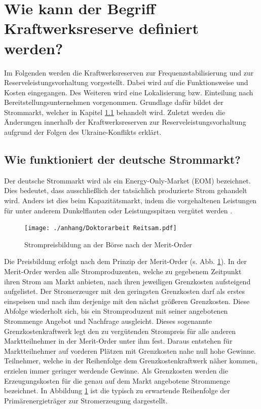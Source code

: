 \section{Wie kann der Begriff Kraftwerksreserve definiert werden?}

	Im Folgenden werden die Kraftwerksreserven zur Frequenzstabilisierung und zur Reserveleistungsvorhaltung vorgestellt.
	Dabei wird auf die Funktionsweise und Kosten eingegangen.
	Des Weiteren wird eine Lokalisierung bzw. Einteilung nach Bereitstellungsunternehmen vorgenommen.
	Grundlage dafür bildet der Strommarkt, welcher in Kapitel \ref{sect: Wie funktioniert der deutsche Strommarkt?} behandelt wird.
	Zuletzt werden die Änderungen innerhalb der Kraftwerksreserven zur Reserveleistungsvorhaltung aufgrund der Folgen des Ukraine-Konflikts erklärt.

	\subsection{Wie funktioniert der deutsche Strommarkt?} \label{sect: Wie funktioniert der deutsche Strommarkt?}
	
		Der deutsche Strommarkt wird als ein Energy-Only-Market (EOM) bezeichnet.
		Dies bedeutet, dass ausschließlich der tatsächlich produzierte Strom gehandelt wird.
		Anders ist dies beim Kapazitätsmarkt, indem die vorgehaltenen Leistungen für unter anderem Dunkelflauten oder Leistungsspitzen vergütet werden \cite{haucap}.
	
		\begin{figure} [H]
			\centering
			\label{Abb. Strompreisbildung Merit Order ohne EE}
			\texttt{[image: ./anhang/Doktorarbeit Reitsam.pdf]}
			\caption{Strompreisbildung an der Börse nach der Merit-Order \cite[S. 68]{Doktorarbeit_Reitsam}}
		\end{figure}
	
		Die Preisbildung erfolgt nach dem Prinzip der Merit-Order (s. Abb. \ref{Abb. Strompreisbildung Merit Order ohne EE}).
		In der Merit-Order werden alle Stromproduzenten, welche zu gegebenem Zeitpunkt ihren Strom am Markt anbieten, nach ihren jeweiligen Grenzkosten aufsteigend aufgelistet.
		Der Stromerzeuger mit den geringsten Grenzkosten darf als erstes einspeisen und nach ihm derjenige mit den nächst größeren Grenzkosten.
		Diese Abfolge wiederholt sich, bis ein Stromproduzent mit seiner angebotenen Strommenge Angebot und Nachfrage ausgleicht.
		Dieses sogenannte Grenzkostenkraftwerk legt den zu vergütenden Strompreis für alle anderen Marktteilnehmer in der Merit-Order unter ihm fest.
		Daraus entstehen für Marktteilnehmer auf vorderen Plätzen mit Grenzkosten nahe null hohe Gewinne.
		Teilnehmer, welche in der Reihenfolge dem Grenzkostenkraftwerk näher kommen, erzielen immer geringer werdende Gewinne.
		Als Grenzkosten werden die Erzeugungskosten für die genau auf dem Markt angebotene Strommenge bezeichnet.
		In Abbildung \ref{Abb. Strompreisbildung Merit Order ohne EE} ist die typisch zu erwartende Reihenfolge der Primärenergieträger zur Stromerzeugung dargestellt. 
		
